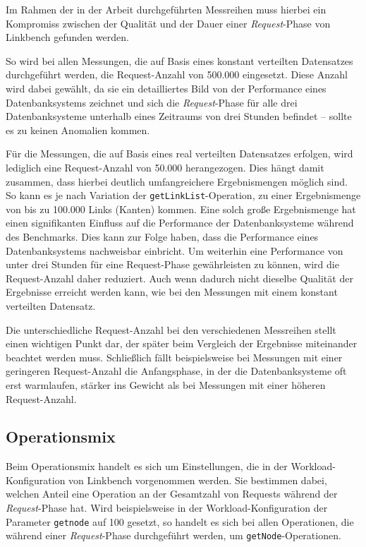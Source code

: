 Im Rahmen der in der Arbeit durchgeführten Messreihen muss hierbei ein Kompromiss zwischen der Qualität und der Dauer einer \textit{Request}-Phase von Linkbench gefunden werden. 

So wird bei allen Messungen, die auf Basis eines konstant verteilten Datensatzes durchgeführt werden, die Request-Anzahl von 500.000 eingesetzt. Diese Anzahl wird dabei gewählt, da sie ein detailliertes Bild von der Performance eines Datenbanksystems zeichnet und sich die \textit{Request}-Phase für alle drei Datenbanksysteme unterhalb eines Zeitraums von drei Stunden befindet -- sollte es zu keinen Anomalien kommen. 

Für die Messungen, die auf Basis eines real verteilten Datensatzes erfolgen, wird lediglich eine Request-Anzahl von 50.000 herangezogen. Dies hängt damit zusammen, dass hierbei deutlich umfangreichere Ergebnismengen möglich sind. So kann es je nach Variation der \texttt{getLinkList}-Operation, zu einer Ergebnismenge von bis zu 100.000 Links (Kanten) kommen. Eine solch große Ergebnismenge hat einen signifikanten Einfluss auf die Performance der Datenbanksysteme während des Benchmarks. Dies kann zur Folge haben, dass die Performance eines Datenbanksystems nachweisbar einbricht. Um weiterhin eine Performance von unter drei Stunden für eine Request-Phase gewährleisten zu können, wird die Request-Anzahl daher reduziert. Auch wenn dadurch nicht dieselbe Qualität der Ergebnisse erreicht werden kann, wie bei den Messungen mit einem konstant verteilten Datensatz.

Die unterschiedliche Request-Anzahl bei den verschiedenen Messreihen stellt einen wichtigen Punkt dar, der später beim Vergleich der Ergebnisse miteinander beachtet werden muss. Schließlich fällt beispielsweise bei Messungen mit einer geringeren Request-Anzahl die Anfangsphase, in der die Datenbanksysteme oft erst warmlaufen, stärker ins Gewicht als bei Messungen mit einer höheren Request-Anzahl.

\subsection{Operationsmix}
\label{analyse:linkbench:operationsmix}
Beim Operationsmix handelt es sich um Einstellungen, die in der Workload-Konfiguration von Linkbench vorgenommen werden. Sie bestimmen dabei, welchen Anteil eine Operation an der Gesamtzahl von Requests während der \textit{Request}-Phase hat. Wird beispielsweise in der Workload-Konfiguration der Parameter \texttt{getnode} auf 100 gesetzt, so handelt es sich bei allen Operationen, die während einer \textit{Request}-Phase durchgeführt werden, um \texttt{getNode}-Operationen.

